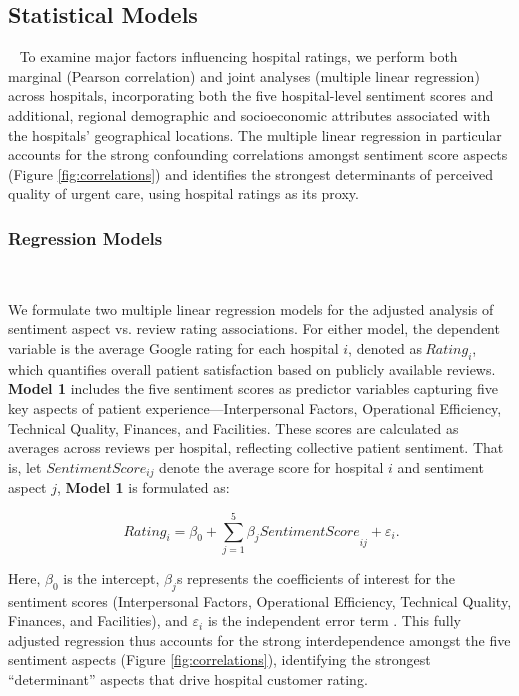 \documentclass[journal,twoside,web]{ieeecolor}
\begin{document}
\subsection{Statistical Models} 
\label{sec:sta}
To examine major factors influencing hospital ratings, we perform both marginal (Pearson correlation) and joint analyses (multiple linear regression) across hospitals, incorporating both the five hospital-level sentiment scores and additional, regional demographic and socioeconomic attributes associated with the hospitals’ geographical locations. The multiple linear regression in particular accounts for the strong confounding correlations amongst sentiment score aspects (Figure \ref{fig:correlations}) and identifies the strongest determinants of perceived quality of urgent care, using hospital ratings as its proxy.

\subsubsection{Regression Models} 

We formulate two multiple linear regression models for the adjusted analysis of sentiment aspect vs. review rating associations. For either model, the dependent variable is the average Google rating for each hospital $i$, denoted as${\ Rating}_{i}$, which quantifies overall patient satisfaction based on publicly available reviews. \textbf{Model 1} includes the five sentiment scores as predictor variables capturing five key aspects of patient experience---Interpersonal Factors, Operational Efficiency, Technical Quality, Finances, and Facilities. These scores are calculated as averages across reviews per hospital, reflecting collective patient sentiment. That is, let ${SentimentScore}_{ij}$ denote the average score for hospital $i$ and sentiment aspect $j$, \textbf{Model 1} is formulated as:

$${\ Rating}_{i} = \beta_{0} + \sum_{j = 1}^{5}{\beta_{j}SentimentScore}_{ij} + \varepsilon_{i}.$$

Here, $\beta_{0}$ is the intercept, $\beta_{j}$s represents the coefficients of interest for the sentiment scores (Interpersonal Factors, Operational Efficiency, Technical Quality, Finances, and Facilities), and $\varepsilon_{i}$ is the independent error term \cite{wooldridge2016introductory}. This fully adjusted regression thus accounts for the strong interdependence amongst the five sentiment aspects (Figure \ref{fig:correlations}), identifying the strongest ``determinant'' aspects that drive hospital
customer rating.
\end{document}
